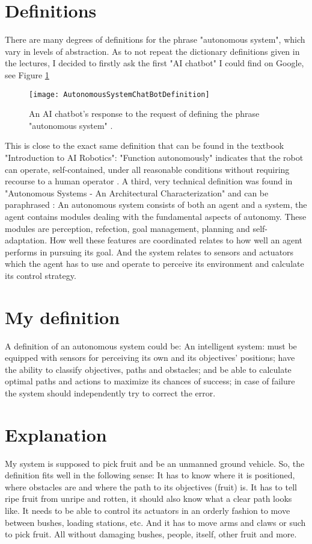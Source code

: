 \documentclass[%
oneside,    %
project,    %
nosummary   %
]{USN-MSc}
\begin{document}
\section{Definitions}
There are many degrees of definitions for the phrase "autonomous system", which vary in levels of abstraction. 
As to not repeat the dictionary definitions given in the lectures, I decided to firstly ask the first "AI chatbot" I could find on Google, see Figure \ref{fig:chat-bot}
\begin{figure}[!ht]
  \centering
  \texttt{[image: AutonomousSystemChatBotDefinition]}
  \caption{An AI chatbot's response to the request of defining the phrase "autonomous system" \cite{ChaiChat90:online}.}
  \label{fig:chat-bot}
\end{figure}
This is close to the exact same definition that can be found in the textbook "Introduction to AI Robotics":
"Function autonomously" indicates that the robot can operate, self-contained, under all reasonable conditions without requiring recourse to a human operator 
\cite{murphy2000introduction}.
A third, very technical definition was found in "Autonomous Systems - An Architectural Characterization" and can be paraphrased \cite{Sifakis}:
An autonomous system consists of both an agent and a system, the agent contains modules dealing with the fundamental aspects of autonomy.
These modules are perception, refection, goal management, planning and self-adaptation. How well these features are coordinated relates to how well an agent performs in pursuing its goal.
And the system relates to sensors and actuators which the agent has to use and operate to perceive its environment and calculate its control strategy.

\section{My definition}
\label{sec:myDefinition}
A definition of an autonomous system could be:
An intelligent system: must be equipped with sensors for perceiving its own and its objectives' positions; 
have the ability to classify objectives, paths and obstacles; 
and be able to calculate optimal paths and actions to maximize its chances of success;
in case of failure the system should independently try to correct the error.

\section{Explanation}
\label{sec:myExplanation}
My system is supposed to pick fruit and be an unmanned ground vehicle.
So, the definition fits well in the following sense:
It has to know where it is positioned, where obstacles are and where the path to its objectives (fruit) is.
It has to tell ripe fruit from unripe and rotten, it should also know what a clear path looks like.
It needs to be able to control its actuators in an orderly fashion to move between bushes, loading stations, etc. 
And it has to move arms and claws or such to pick fruit. All without damaging bushes, people, itself, other fruit and more.
\end{document}
